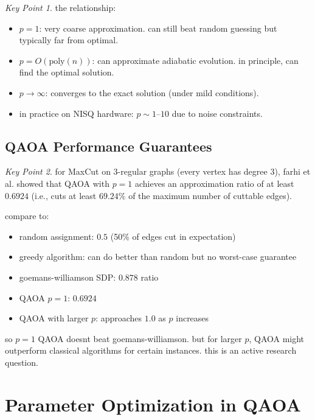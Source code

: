 \documentclass[11pt,a4paper]{article}
\theoremstyle{definition}
\theoremstyle{remark}
\newtheorem*{keypoint}{Key Point}
\begin{document}
\begin{keypoint}
the relationship:
\begin{itemize}
    \item $p = 1$: very coarse approximation. can still beat random guessing but typically far from optimal.
    \item $p = O(\text{poly}(n))$: can approximate adiabatic evolution. in principle, can find the optimal solution.
    \item $p \to \infty$: converges to the exact solution (under mild conditions).
    \item in practice on NISQ hardware: $p \sim 1$--$10$ due to noise constraints.
\end{itemize}
\end{keypoint}

\subsection{QAOA Performance Guarantees}

\begin{keypoint}
for MaxCut on 3-regular graphs (every vertex has degree 3), farhi et al. showed that QAOA with $p = 1$ achieves an approximation ratio of at least $0.6924$ (i.e., cuts at least $69.24\%$ of the maximum number of cuttable edges).

compare to:
\begin{itemize}
    \item random assignment: $0.5$ (50\% of edges cut in expectation)
    \item greedy algorithm: can do better than random but no worst-case guarantee
    \item goemans-williamson SDP: $0.878$ ratio
    \item QAOA $p = 1$: $0.6924$
    \item QAOA with larger $p$: approaches $1.0$ as $p$ increases
\end{itemize}

so $p = 1$ QAOA doesnt beat goemans-williamson. but for larger $p$, QAOA might outperform classical algorithms for certain instances. this is an active research question.
\end{keypoint}

\section{Parameter Optimization in QAOA}
\end{document}

